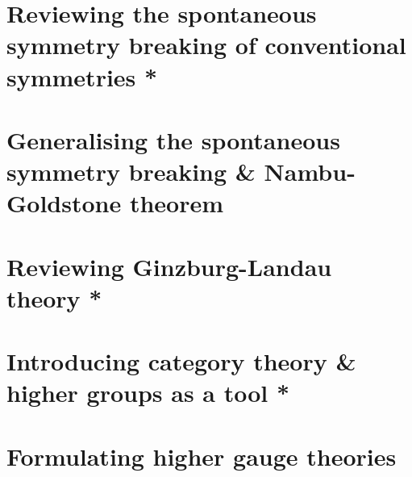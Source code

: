\documentclass{article}
\theoremstyle{definition}
\numberwithin{equation}{section}
\begin{document}
\section{Reviewing the spontaneous symmetry breaking of conventional symmetries *}
\section{Generalising the spontaneous symmetry breaking \& Nambu-Goldstone theorem}
\section{Reviewing Ginzburg-Landau theory *}
\section{Introducing category theory \& higher groups as a tool *}
\section{Formulating higher gauge theories}
\end{document}
